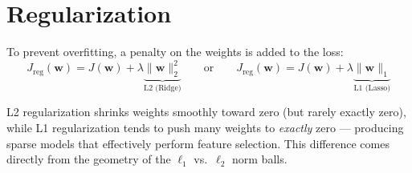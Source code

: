 
\section{Regularization}

To prevent overfitting, a penalty on the weights is added to the loss:
\[
  J_{\text{reg}}(\mathbf{w}) = J(\mathbf{w}) + \lambda \underbrace{\|\mathbf{w}\|_2^2}_{\text{L2 (Ridge)}}
  \qquad\text{or}\qquad
  J_{\text{reg}}(\mathbf{w}) = J(\mathbf{w}) + \lambda \underbrace{\|\mathbf{w}\|_1}_{\text{L1 (Lasso)}}
\]

\begin{keyidea}
L2 regularization shrinks weights smoothly toward zero (but rarely exactly
zero), while L1 regularization tends to push many weights to \emph{exactly}
zero — producing sparse models that effectively perform feature selection.
This difference comes directly from the geometry of the $\ell_1$ vs.\
$\ell_2$ norm balls.
\end{keyidea}
